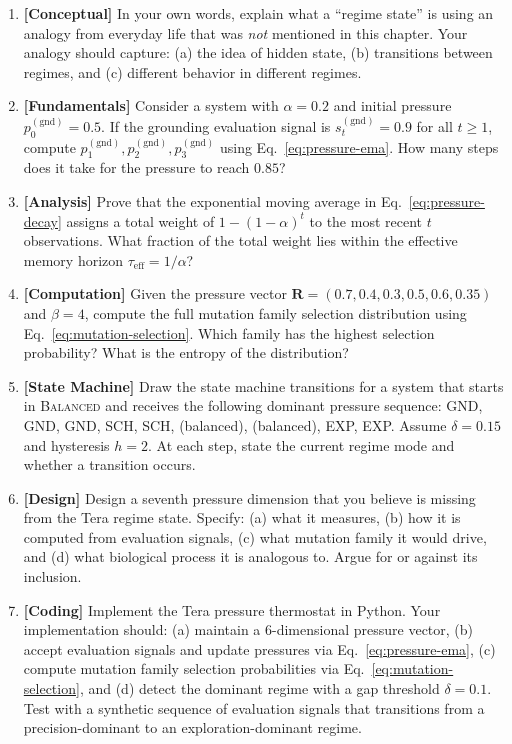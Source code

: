 \begin{enumerate}[label=\textbf{9.\arabic*.}, leftmargin=2.5em]

\item \textbf{[Conceptual]} In your own words, explain what a ``regime state'' is using an analogy from everyday life that was \emph{not} mentioned in this chapter. Your analogy should capture: (a) the idea of hidden state, (b) transitions between regimes, and (c) different behavior in different regimes.

\item \textbf{[Fundamentals]} Consider a system with $\alpha = 0.2$ and initial pressure $p_0^{(\text{gnd})} = 0.5$. If the grounding evaluation signal is $s_t^{(\text{gnd})} = 0.9$ for all $t \geq 1$, compute $p_1^{(\text{gnd})}, p_2^{(\text{gnd})}, p_3^{(\text{gnd})}$ using Eq.~\eqref{eq:pressure-ema}. How many steps does it take for the pressure to reach $0.85$?

\item \textbf{[Analysis]} Prove that the exponential moving average in Eq.~\eqref{eq:pressure-decay} assigns a total weight of $1 - (1-\alpha)^t$ to the most recent $t$ observations. What fraction of the total weight lies within the effective memory horizon $\tau_{\text{eff}} = 1/\alpha$?

\item \textbf{[Computation]} Given the pressure vector $\mathbf{R} = (0.7, 0.4, 0.3, 0.5, 0.6, 0.35)$ and $\beta = 4$, compute the full mutation family selection distribution using Eq.~\eqref{eq:mutation-selection}. Which family has the highest selection probability? What is the entropy of the distribution?

\item \textbf{[State Machine]} Draw the state machine transitions for a system that starts in \textsc{Balanced} and receives the following dominant pressure sequence: GND, GND, GND, SCH, SCH, (balanced), (balanced), EXP, EXP. Assume $\delta = 0.15$ and hysteresis $h = 2$. At each step, state the current regime mode and whether a transition occurs.

\item \textbf{[Design]} Design a seventh pressure dimension that you believe is missing from the Tera regime state. Specify: (a) what it measures, (b) how it is computed from evaluation signals, (c) what mutation family it would drive, and (d) what biological process it is analogous to. Argue for or against its inclusion.

\item \textbf{[Coding]} Implement the Tera pressure thermostat in Python. Your implementation should: (a) maintain a 6-dimensional pressure vector, (b) accept evaluation signals and update pressures via Eq.~\eqref{eq:pressure-ema}, (c) compute mutation family selection probabilities via Eq.~\eqref{eq:mutation-selection}, and (d) detect the dominant regime with a gap threshold $\delta = 0.1$. Test with a synthetic sequence of evaluation signals that transitions from a precision-dominant to an exploration-dominant regime.


\end{enumerate}
